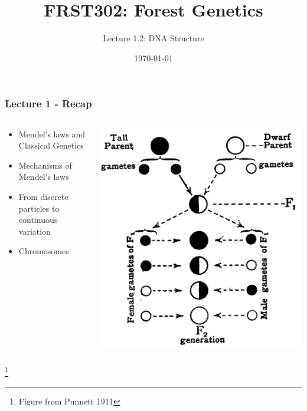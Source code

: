 \documentclass{beamer}
\title{\Huge FRST302: Forest Genetics}
\author{\Large Lecture 1.2: DNA Structure}
\date{\today}
\newcommand\blfootnote[1]{%
	\begingroup
	\renewcommand\thefootnote{}\footnote{#1}%
	\addtocounter{footnote}{-1}%
	\endgroup
}
\begin{document}
	\maketitle
	
	
	
	
	\begin{frame}
		\frametitle{Lecture 1 - Recap}
		\begin{columns}
			\begin{column}{0.5\textwidth}
				\begin{itemize}
			\item Mendel's laws and Classical Genetics
			\item Mechanisms of Mendel's laws
			\item From discrete particles to continuous variation
			\item Chromosomes
				\end{itemize}
			\end{column}
			\begin{column}{0.5\textwidth}
				
	\includegraphics[keepaspectratio, width  =\textwidth]{img/Pgen_to_F2}
			\end{column}
		\end{columns}

			\blfootnote{Figure from Punnett 1911}
			
	\end{frame}
	
\end{document}
